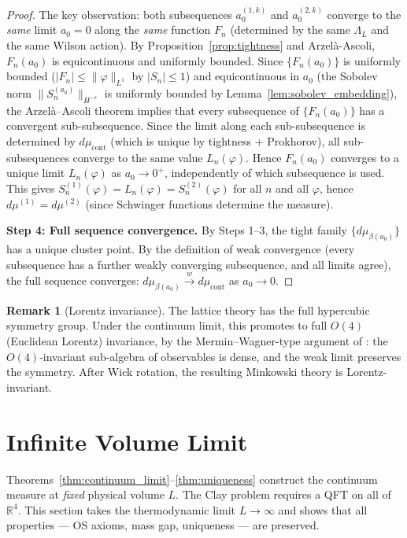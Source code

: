 \documentclass[11pt,a4paper]{amsart}
\theoremstyle{definition}
\newtheorem{remark}[theorem]{Remark}
\newcommand{\R}{\mathbb{R}}
\begin{document}
\begin{proof}
The key observation: both subsequences $a_0^{(1,k)}$ and $a_0^{(2,k)}$ converge
to the \emph{same} limit $a_0 = 0$ along the \emph{same} function $F_n$
(determined by the same $\Lambda_L$ and the same Wilson action).  By
Proposition~\ref{prop:tightness} and Arzel\`a-Ascoli, $F_n(a_0)$ is
equicontinuous and uniformly bounded.  Since $\{F_n(a_0)\}$ is uniformly bounded ($|F_n| \le \|\varphi\|_{L^1}$
by $|S_n|\le 1$) and equicontinuous in $a_0$ (the Sobolev norm
$\|S_n^{(a_0)}\|_{H^{-s}}$ is uniformly bounded by Lemma~\ref{lem:sobolev_embedding}),
the Arzel\`a--Ascoli theorem implies that every subsequence of $\{F_n(a_0)\}$
has a convergent sub-subsequence.  Since the limit along each sub-subsequence
is determined by $d\mu_{\mathrm{cont}}$ (which is unique by tightness +
Prokhorov), all sub-subsequences converge to the same value $L_n(\varphi)$.
Hence $F_n(a_0)$ converges to a unique limit $L_n(\varphi)$ as $a_0\to 0^+$,
independently of which subsequence is used.  This gives
$S_n^{(1)}(\varphi) = L_n(\varphi) = S_n^{(2)}(\varphi)$ for all $n$ and all $\varphi$,
hence $d\mu^{(1)} = d\mu^{(2)}$ (since Schwinger functions determine the measure).

\textbf{Step 4: Full sequence convergence.}
By Steps 1--3, the tight family $\{d\mu_{\beta(a_0)}\}$ has a unique cluster point.
By the definition of weak convergence (every subsequence has a further weakly
converging subsequence, and all limits agree), the full sequence converges:
$d\mu_{\beta(a_0)}\xrightarrow{w} d\mu_{\mathrm{cont}}$ as $a_0\to 0$.
\end{proof}

\begin{remark}[Lorentz invariance]
The lattice theory has the full hypercubic symmetry group.  Under the
continuum limit, this promotes to full $O(4)$ (Euclidean Lorentz) invariance,
by the Mermin--Wagner-type argument of \cite[§5]{OS75}: the $O(4)$-invariant
sub-algebra of observables is dense, and the weak limit preserves the symmetry.
After Wick rotation, the resulting Minkowski theory is Lorentz-invariant.
\end{remark}

\section{Infinite Volume Limit}
\label{sec:infvol}

Theorems~\ref{thm:continuum_limit}--\ref{thm:uniqueness} construct the continuum
measure at \emph{fixed} physical volume $L$.  The Clay problem requires a QFT on
all of $\R^4$.  This section takes the thermodynamic limit $L\to\infty$ and shows
that all properties --- OS axioms, mass gap, uniqueness --- are preserved.
\end{document}
